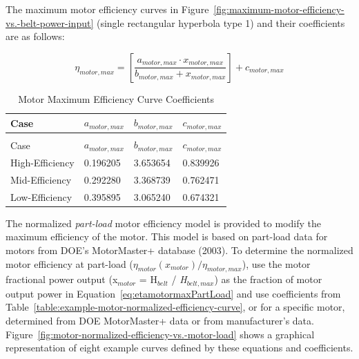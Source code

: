 The maximum motor efficiency curves in Figure~\ref{fig:maximum-motor-efficiency-vs.-belt-power-input} (single rectangular hyperbola type 1) and their coefficients are as follows:

\begin{equation}
{\eta_{motor,max}} = \left[ {\frac{{{a_{motor,max}} \cdot {x_{motor,max}}}}{{{b_{motor,max}} + {x_{motor,max}}}}} \right] + {c_{motor,max}}
\label{eq:etamotormax}
\end{equation}

\begin{longtable}[c]{@{}llll@{}}
\caption{Motor Maximum Efficiency Curve Coefficients \label{table:motor-maximum-efficiency-curve-coefficients}} \tabularnewline
\toprule 
Case & \(a_{motor,max}\) & \(b_{motor,max}\) & \(c_{motor,max}\) \tabularnewline
\midrule
\endfirsthead

\caption[]{Motor Maximum Efficiency Curve Coefficients} \tabularnewline
\toprule 
Case & \(a_{motor,max}\) & \(b_{motor,max}\) & \(c_{motor,max}\) \tabularnewline
\midrule
\endhead

High-Efficiency & 0.196205 & 3.653654 & 0.839926 \tabularnewline
Mid-Efficiency & 0.292280 & 3.368739 & 0.762471 \tabularnewline
Low-Efficiency & 0.395895 & 3.065240 & 0.674321 \tabularnewline
\bottomrule
\end{longtable}

The normalized \emph{part-load} motor efficiency model is provided to modify the maximum efficiency of the motor. This model is based on part-load data for motors from DOE's MotorMaster+ database (2003). To determine the normalized motor efficiency at part-load (\(\eta_{motor}(x_{motor}) / \eta_{motor,max}\)), use the motor fractional power output (x\(_{motor}\) = H\(_{belt}\) / \emph{H\(_{belt,max}\)}) as the fraction of motor output power in Equation~\ref{eq:etamotormaxPartLoad} and use coefficients from Table~\ref{table:example-motor-normalized-efficiency-curve}, or for a specific motor, determined from DOE MotorMaster+ data or from manufacturer's data. Figure~\ref{fig:motor-normalized-efficiency-vs.-motor-load} shows a graphical representation of eight example curves defined by these equations and coefficients.

